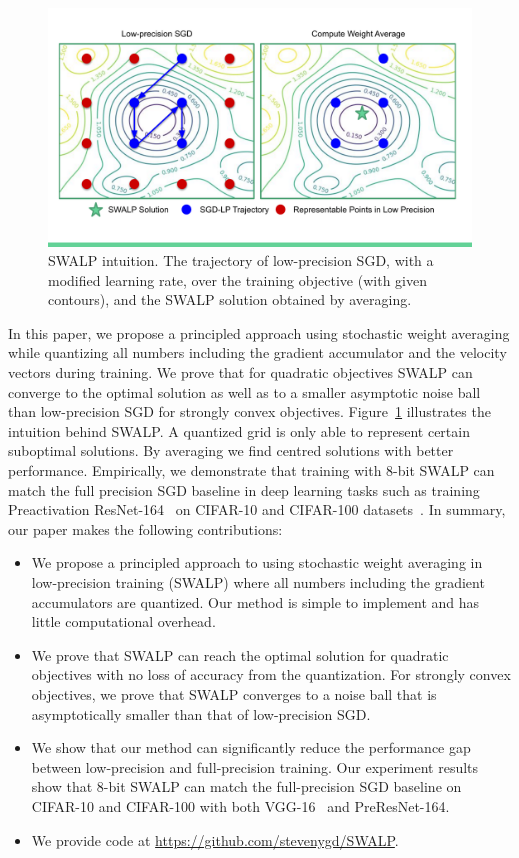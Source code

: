 \documentclass{article}
\begin{document}
\begin{figure}[t]
    \centering
    \includegraphics[width=\linewidth]{figures/swalp.pdf}
    \caption{SWALP intuition. The trajectory of low-precision SGD, with a modified learning rate, over the training objective (with given contours), and the SWALP solution obtained by averaging. 
    }
    \label{fig:swalpexp}
\end{figure}

In this paper, we propose a principled approach using stochastic weight averaging while quantizing all numbers including the gradient accumulator and the velocity vectors during training. 
We prove that for quadratic objectives SWALP can converge to the optimal solution as well as to a smaller asymptotic noise ball than low-precision SGD for strongly convex objectives.
Figure~\ref{fig:swalpexp} illustrates the intuition behind SWALP. 
A quantized grid is only able to represent certain suboptimal solutions. By averaging we find centred solutions with better performance.
Empirically, we demonstrate that training with 8-bit SWALP can match the full precision SGD baseline in deep learning tasks such as training Preactivation ResNet-164~\cite{preact-resnet} on CIFAR-10 and CIFAR-100 datasets~\cite{CIFAR10}. 
In summary, our paper makes the following contributions:
\begin{itemize}
    \item We propose a principled approach to using stochastic weight averaging in low-precision training (SWALP) where all numbers including the gradient accumulators are quantized. Our method is simple to implement and has little computational overhead.
    \item We prove that SWALP can reach the optimal solution for quadratic objectives with no loss of accuracy from the quantization. For strongly convex objectives, we prove that SWALP converges to a noise ball that is asymptotically smaller than that of low-precision SGD.
    \item We show that our method can significantly reduce the performance gap between low-precision and full-precision training. Our experiment results show that 8-bit SWALP can match the full-precision SGD baseline on CIFAR-10 and CIFAR-100 with both VGG-16~\cite{VGG} and PreResNet-164. 
    \item We provide code at \url{https://github.com/stevenygd/SWALP}.
\end{itemize}
\end{document}
